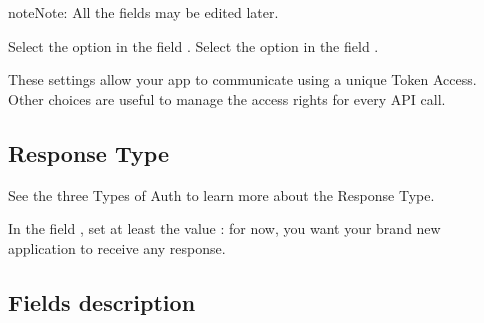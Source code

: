 \documentclass[a4paper,12pt,english]{sphinxmanual}
\begin{document}
\begin{sphinxadmonition}{note}{Note:}
All the fields may be edited later.
\end{sphinxadmonition}

Select the  option in the field .
Select the  option in the field .

These settings allow your app to communicate using a unique Token Access.
Other choices are useful to manage the access rights for every API call.


\subsection{Response Type}
\label{\detokenize{cookbook/create_an_application:response-type}}
See the three Types of Auth to learn more about the Response Type.

In the field , set at least the value : for now, you want your brand new application to receive any response.


\subsection{Fields description}
\label{\detokenize{cookbook/create_an_application:fields-description}}
\end{document}
